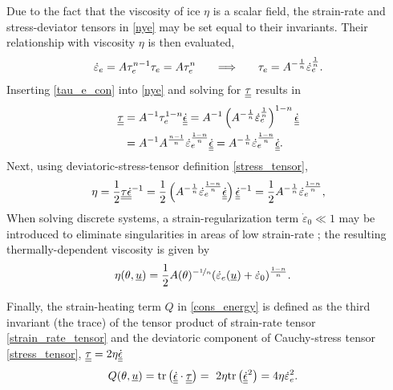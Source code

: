 Due to the fact that the viscosity of ice $\eta$ is a scalar field, the strain-rate and stress-deviator tensors in \cref{nye} may be set equal to their invariants.  Their relationship with  viscosity $\eta$ is then evaluated,
\begin{align}
  \label{tau_e_con}
  \dot{\varepsilon}_e = A \tau_e^{n-1} \tau_e = A \tau_e^n \hspace{5mm}
  \implies \hspace{5mm} \tau_e = A^{-\frac{1}{n}} \dot{\varepsilon}_e^{\frac{1}{n}}.
\end{align}
Inserting \cref{tau_e_con} into \cref{nye} and solving for $\underline{\underline{\tau}}$ results in
\begin{align*}
  \underline{\underline{\tau}} &= A^{-1} \tau_e^{1-n} \underline{\underline{\dot{\epsilon}}} 
       = A^{-1} \left( A^{-\frac{1}{n}} \dot{\varepsilon}_e^{\frac{1}{n}} \right)^{1-n} \underline{\underline{\dot{\epsilon}}} \\
       &= A^{-1} A^{\frac{n - 1}{n}} \dot{\varepsilon}_e^{\frac{1-n}{n}} \underline{\underline{\dot{\epsilon}}} 
       = A^{-\frac{1}{n}} \dot{\varepsilon}_e^{\frac{1-n}{n}} \underline{\underline{\dot{\epsilon}}}.
\end{align*}
Next, using deviatoric-stress-tensor definition \cref{stress_tensor},
\begin{align*}
  \eta = \frac{1}{2} \underline{\underline{\tau}} \underline{\underline{\dot{\epsilon}}}^{-1} 
       = \frac{1}{2} \left( A^{-\frac{1}{n}} \dot{\varepsilon}_e^{\frac{1-n}{n}} \underline{\underline{\dot{\epsilon}}} \right) \underline{\underline{\dot{\epsilon}}}^{-1} 
       = \frac{1}{2} A^{-\frac{1}{n}} \dot{\varepsilon}_e^{\frac{1-n}{n}},
\end{align*}
When solving discrete systems, a strain-regularization term $\dot{\varepsilon}_0 \ll 1$ may be introduced to eliminate singularities in areas of low strain-rate \citep{pattyn_2003}; the resulting thermally-dependent viscosity is given by
\begin{align}
  \label{viscosity}
  \eta(\theta, \underline{u}) &= \frac{1}{2}A(\theta)^{-\nicefrac{1}{n}} (\dot{\varepsilon}_e(\underline{u}) + \dot{\varepsilon}_0)^{\frac{1-n}{n}}.
\end{align} 

Finally, the strain-heating  term $Q$ in \cref{cons_energy} is defined as the third invariant (the trace) of the tensor product of strain-rate tensor \cref{strain_rate_tensor} and the deviatoric component of Cauchy-stress tensor \cref{stress_tensor}, $\underline{\underline{\tau}} = 2\eta \underline{\underline{\dot{\epsilon}}}$ \citep{greve_2009}
\begin{align}
  \label{strain_heat}
  Q(\theta, \underline{u}) &= \mathrm{tr}\left( \underline{\underline{\dot{\epsilon}}} \cdot \underline{\underline{\tau}} \right) = \ 2 \eta \mathrm{tr}\left(\underline{\underline{\dot{\epsilon}}}^2\right) = 4 \eta \dot{\varepsilon}_e^2.
\end{align}

